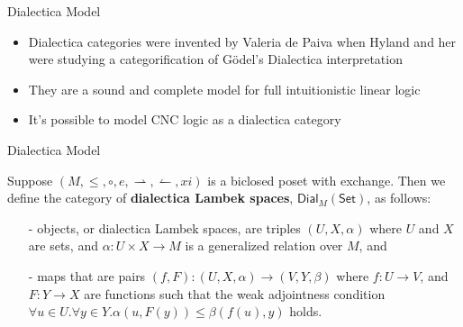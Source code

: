 \documentclass{beamer}
\let\mto\to
\let\to\relax
\newcommand{\rto}{\leftharpoonup}
\newcommand{\lto}{\rightharpoonup}
\newcommand{\Set}{\mathsf{Set}}
\begin{document}
\begin{frame}{Dialectica Model}  
  \begin{itemize}
  \item Dialectica categories were invented by Valeria de Paiva when Hyland and her were studying a categorification of G\"odel's Dialectica interpretation
  \item[]
  \item They are a sound and complete model for full intuitionistic linear logic
  \item[]
  \item It's possible to model CNC logic as a dialectica category
  \end{itemize}
\end{frame}

\begin{frame}{Dialectica Model}
  \begin{definition}
  \label{def:dialectica-lambek-spaces}
  Suppose $(M, \leq, \circ, e, \lto, \rto,xi)$ is a biclosed poset with exchange. Then
  we define the category of \textbf{dialectica Lambek spaces},
  $\mathsf{Dial}_M(\Set)$, as follows:
  \begin{itemize}
  \item[-] objects, or dialectica Lambek spaces, are triples $(U, X,
    \alpha)$ where $U$ and $X$ are sets, and $\alpha : U \times X \mto
    M$ is a generalized relation over $M$, and

  \item[-] maps that are pairs $(f, F) : (U , X, \alpha) \mto (V , Y ,
    \beta)$ where $f : U \mto V$, and $F : Y \mto X$ are functions
    such that the weak adjointness condition
    $\forall u \in U.\forall y \in Y. \alpha(u , F(y)) \leq \beta(f(u), y)$
    holds.
  \end{itemize}
\end{definition}
\end{frame}
\end{document}
